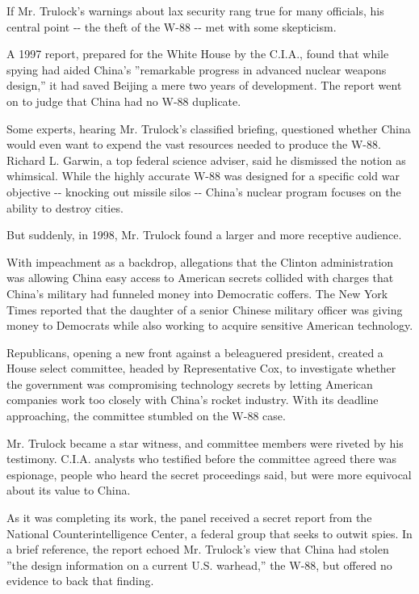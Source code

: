 If Mr. Trulock's warnings about lax security rang true for many
officials, his central point -\/- the theft of the W-88 -\/- met with
some skepticism.

A 1997 report, prepared for the White House by the C.I.A., found that
while spying had aided China's ''remarkable progress in advanced nuclear
weapons design,'' it had saved Beijing a mere two years of development.
The report went on to judge that China had no W-88 duplicate.

Some experts, hearing Mr. Trulock's classified briefing, questioned
whether China would even want to expend the vast resources needed to
produce the W-88. Richard L. Garwin, a top federal science adviser, said
he dismissed the notion as whimsical. While the highly accurate W-88 was
designed for a specific cold war objective -\/- knocking out missile
silos -\/- China's nuclear program focuses on the ability to destroy
cities.

But suddenly, in 1998, Mr. Trulock found a larger and more receptive
audience.

With impeachment as a backdrop, allegations that the Clinton
administration was allowing China easy access to American secrets
collided with charges that China's military had funneled money into
Democratic coffers. The New York Times reported that the daughter of a
senior Chinese military officer was giving money to Democrats while also
working to acquire sensitive American technology.

Republicans, opening a new front against a beleaguered president,
created a House select committee, headed by Representative Cox, to
investigate whether the government was compromising technology secrets
by letting American companies work too closely with China's rocket
industry. With its deadline approaching, the committee stumbled on the
W-88 case.

Mr. Trulock became a star witness, and committee members were riveted by
his testimony. C.I.A. analysts who testified before the committee agreed
there was espionage, people who heard the secret proceedings said, but
were more equivocal about its value to China.

As it was completing its work, the panel received a secret report from
the National Counterintelligence Center, a federal group that seeks to
outwit spies. In a brief reference, the report echoed Mr. Trulock's view
that China had stolen ''the design information on a current U.S.
warhead,'' the W-88, but offered no evidence to back that finding.


